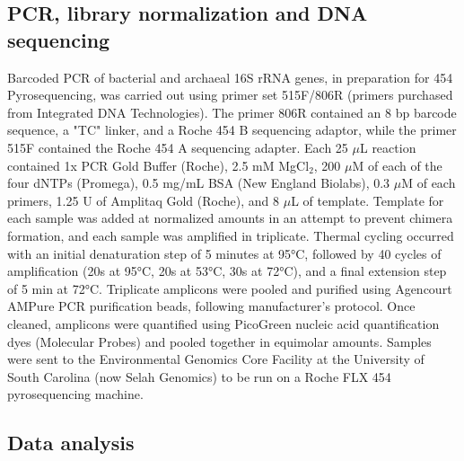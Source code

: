  \subsection{PCR, library normalization and DNA sequencing} 
 Barcoded PCR of bacterial and archaeal 16S
 rRNA genes, in preparation for 454 Pyrosequencing, was carried out using
 primer set 515F/806R \citep{21349862} (primers purchased from Integrated DNA
 Technologies).  The primer 806R contained an 8 bp
 barcode sequence, a "TC" linker, and a Roche 454 B sequencing adaptor, while
 the primer 515F contained the Roche 454 A sequencing adapter. Each 25 $\mu$L
 reaction contained 1x PCR Gold Buffer (Roche), 2.5 mM MgCl$_{2}$, 200 $\mu$M
 of each of the four dNTPs (Promega), 0.5 mg/mL BSA (New England Biolabs), 0.3
 $\mu$M of each primers, 1.25 U of Amplitaq Gold (Roche), and 8 $\mu$L of
 template. Template for each sample was added at normalized amounts in an
 attempt to prevent chimera formation, and each sample was amplified in
 triplicate. Thermal cycling occurred with an initial denaturation step of 5
 minutes at 95°C, followed by 40 cycles of amplification (20s at 95°C, 20s at
 53°C, 30s at 72°C), and a final extension step of 5 min at 72°C. Triplicate
 amplicons were pooled and purified using Agencourt AMPure PCR purification
 beads, following manufacturer’s protocol. Once cleaned, amplicons were
 quantified using PicoGreen nucleic acid quantification dyes (Molecular Probes)
 and pooled together in equimolar amounts. Samples were sent to the
 Environmental Genomics Core Facility at the University of South Carolina (now
 Selah Genomics) to be run on a Roche FLX 454 pyrosequencing machine. 
\subsection{Data analysis} 
